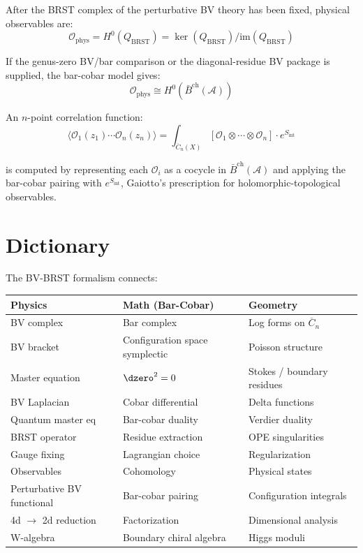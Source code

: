 \begin{theorem}
After the BRST complex of the perturbative BV theory has been fixed,
physical observables are:
\[\mathcal{O}_{\text{phys}} = H^0(Q_{\text{BRST}}) =
\ker(Q_{\text{BRST}})/\text{im}(Q_{\text{BRST}})\]

If the genus-zero BV/bar comparison or the diagonal-residue BV package
is supplied, the bar-cobar model gives:
\[\mathcal{O}_{\text{phys}} \cong H^0(\bar{B}^{\text{ch}}(\mathcal{A}))\]
\end{theorem}

\begin{example}
An $n$-point correlation function:
\[\langle \mathcal{O}_1(z_1) \cdots \mathcal{O}_n(z_n) \rangle =
\int_{\overline{C}_n(X)} [\mathcal{O}_1 \otimes \cdots \otimes \mathcal{O}_n]
\cdot e^{S_{\text{int}}}\]

is computed by representing each $\mathcal{O}_i$ as a cocycle in $\bar{B}^{\text{ch}}(\mathcal{A})$ and applying the bar-cobar pairing with $e^{S_{\text{int}}}$, Gaiotto's prescription for holomorphic-topological observables.
\end{example}

\section{Dictionary}

\begin{remark}[Dictionary]
The BV-BRST formalism connects:

\begin{center}
\begin{tabular}{|l|l|l|}
\hline
\textbf{Physics} & \textbf{Math (Bar-Cobar)} & \textbf{Geometry} \\
\hline
BV complex & Bar complex & Log forms on $\overline{C}_n$ \\
BV bracket & Configuration space symplectic & Poisson structure \\
Master equation & $\dzero^2 = 0$ & Stokes / boundary residues \\
BV Laplacian & Cobar differential & Delta functions \\
Quantum master eq & Bar-cobar duality & Verdier duality \\
BRST operator & Residue extraction & OPE singularities \\
Gauge fixing & Lagrangian choice & Regularization \\
Observables & Cohomology & Physical states \\
Perturbative BV functional & Bar-cobar pairing & Configuration integrals \\
4d $\to$ 2d reduction & Factorization & Dimensional analysis \\
W-algebra & Boundary chiral algebra & Higgs moduli \\
\hline
\end{tabular}
\end{center}
\end{remark}

